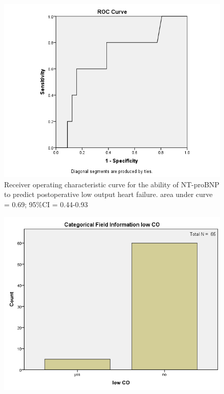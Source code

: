 \documentclass[14pt,a4paper,onecolumn]{extarticle}
\begin{document}
\clearpage
\begin{figure}
    \centering
    \includegraphics[scale=0.7]{../images/roc_low_co.png}
    \small\caption{Receiver operating characteristic curve for the ability of NT-proBNP to predict postoperative low output heart failure. area under curve = 0.69; 95\%CI = 0.44-0.93}
    \label{}
\end{figure}

\clearpage
\begin{figure}
    \centering
    \includegraphics[scale=0.7]{../images/cat_low_co.png}
    \small\caption{}
    \label{}
\end{figure}
\end{document}
